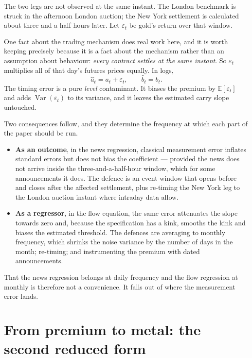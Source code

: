 \documentclass[11pt,a4paper]{article}
\newcommand{\Var}{\operatorname{Var}}
\begin{document}
The two legs are not observed at the same instant. The London benchmark is
struck in the afternoon London auction; the New York settlement is calculated
about three and a half hours later. Let $\varepsilon_t$ be gold's return over
that window.

One fact about the trading mechanism does real work here, and it is worth
keeping precisely because it is a fact about the mechanism rather than an
assumption about behaviour: \emph{every contract settles at the same instant}.
So $\varepsilon_t$ multiplies all of that day's futures prices equally. In
logs,
\begin{equation}
\widehat{a}_t = a_t + \varepsilon_t,
\qquad
\widehat{b}_t = b_t .
\end{equation}
The timing error is a pure \emph{level} contaminant. It biases the premium by
$\mathbb{E}[\varepsilon_t]$ and adds $\Var(\varepsilon_t)$ to its variance, and
it leaves the estimated carry slope untouched.

Two consequences follow, and they determine the frequency at which each part of
the paper should be run.

\begin{itemize}[leftmargin=1.2em,itemsep=3pt,topsep=2pt]
\item \textbf{As an outcome}, in the news regression, classical measurement
error inflates standard errors but does not bias the coefficient --- provided
the news does not arrive inside the three-and-a-half-hour window, which for
some announcements it does. The defence is an event window that opens before
and closes after the affected settlement, plus re-timing the New York leg to
the London auction instant where intraday data allow.
\item \textbf{As a regressor}, in the flow equation, the same error attenuates
the slope towards zero and, because the specification has a kink, smooths the
kink and biases the estimated threshold. The defences are averaging to monthly
frequency, which shrinks the noise variance by the number of days in the month;
re-timing; and instrumenting the premium with dated announcements.
\end{itemize}

That the news regression belongs at daily frequency and the flow regression at
monthly is therefore not a convenience. It falls out of where the measurement
error lands.

\section{From premium to metal: the second reduced form}
\label{sec:flow}
\end{document}
